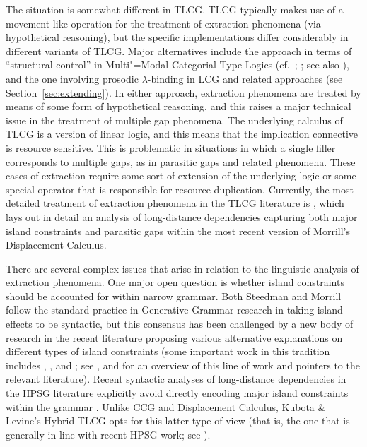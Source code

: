 \documentclass[output=paper
                ,modfonts
 	        ,biblatex
                ,babelshorthands
                ,newtxmath
                ,draftmode
                ,colorlinks, citecolor=brown
]{langscibook}
\begin{document}
The situation is somewhat different in TLCG. TLCG typically makes use
of a movement-like operation for the treatment of extraction
phenomena (via hypothetical reasoning), but the specific implementations differ considerably in
different variants of TLCG. Major alternatives include the approach in
terms of   ``structural control'' in Multi"=Modal Categorial Type
Logics (cf.~\citealt[Chapter~1]{BernardiPhD}; \citealt[Section~2.4]{Moortgat2011a-u};
see also \citealt[Chapter~7]{Morrill94a-u}), and the one involving prosodic
$\lambda$-binding in LCG and related approaches (see
Section~\ref{sec:extending}). In either approach, extraction phenomena
are treated by means of some form of hypothetical reasoning, and this
raises a major technical issue in the treatment of multiple gap
phenomena. The underlying calculus of TLCG is a version of linear
logic, and this means that the implication connective is resource
sensitive. This is problematic in situations in which a single filler
corresponds to multiple gaps, as in parasitic gaps and related
phenomena. These cases of extraction require some sort of extension of
the underlying logic or some special operator that is responsible for
resource duplication. Currently, the most detailed treatment of
extraction phenomena in the TLCG literature is \citet{morrilllp},
which lays out in detail an analysis of long-distance dependencies
capturing both major island constraints and parasitic gaps within the
most recent version of Morrill's Displacement Calculus.

There are several complex issues that arise in relation to the
linguistic analysis of extraction phenomena. One major open question
is whether island constraints should be accounted for within narrow
grammar. Both Steedman and Morrill follow the standard practice in
Generative Grammar research in taking island effects to be syntactic,
but this consensus has been challenged by a new body of research in
the recent literature proposing various alternative explanations on
different types of island constraints (some important work in this
tradition includes , ,
 and ; see
,  and
 for an overview of this line of work and pointers
to the relevant literature). Recent syntactic analyses of
long-distance dependencies in the HPSG literature explicitly avoid
directly encoding major island constraints within the grammar
\citep{Sag2010b,chaves12b}. Unlike CCG and Displacement Calculus,
Kubota \& Levine's Hybrid TLCG opts for this latter type of view (that
is, the one that is generally in line with recent HPSG work; see
\citealt[Chapter~10]{KubotaLevineBook}).
\end{document}
